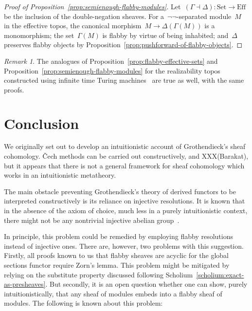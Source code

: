 \documentclass[oneside]{amsart}
\theoremstyle{definition}
\theoremstyle{plain}
\theoremstyle{remark}
\newtheorem{rem}[defn]{Remark}
\newcommand{\Set}{\mathrm{Set}}
\newcommand{\Eff}{\mathrm{Ef{}f}}
\renewcommand{\_}{\mathpunct{.}\,}
\newcommand{\effective}{ef{}fective\xspace}
\begin{document}
\begin{proof}[Proof of Proposition~\ref{prop:semienough-flabby-modules}]
Let~$(\Gamma \dashv \Delta) : \Set \to \Eff$ be the inclusion of the
double-negation sheaves. For a~$\neg\neg$-separated module~$M$ in the \effective
topos, the canonical morphism~$M \to \Delta(\Gamma(M))$ is a monomorphism; the
set~$\Gamma(M)$ is flabby by virtue of being inhabited; and~$\Delta$ preserves
flabby objects by Proposition~\ref{prop:pushforward-of-flabby-objects}.
\end{proof}

\begin{rem}The analogues of Proposition~\ref{prop:flabby-effective-sets} and
Proposition~\ref{prop:semienough-flabby-modules} for the realizability topos
constructed using infinite time Turing
machines~\cite{bauer:injection,hamkins-lewis:ittm} are true as well, with the
same proofs.\end{rem}


\section{Conclusion}
\label{sect:conclusion}

We originally set out to develop an intuitionistic account of Grothendieck's
sheaf cohomology. Čech methods can be carried out constructively, and
XXX(Barakat), but it appears that there is not a general framework for sheaf
cohomology which works in an intuitionistic metatheory.

The main obstacle preventing Grothendieck's theory of derived functors to be interpreted
constructively is its reliance on injective resolutions. It is known that in
the absence of the axiom of choice, much less in a purely intuitionistic
context, there might not be any nontrivial injective abelian
group~\cite{blass:inj-proj-axc}.

In principle, this problem could be remedied by employing flabby resolutions
instead of injective ones. There are, however, two problems with this
suggestion. Firstly, all proofs known to us that flabby sheaves are
acyclic for the global sections functor require Zorn's lemma. This problem might
be mitigated by relying on the substitute property discussed
following Scholium~\ref{scholium:exact-as-presheaves}.
But secondly, it is an open question whether
one can show, purely intuitionistically, that any sheaf of modules embeds into
a flabby sheaf of modules. The following is known about this problem:
\end{document}
